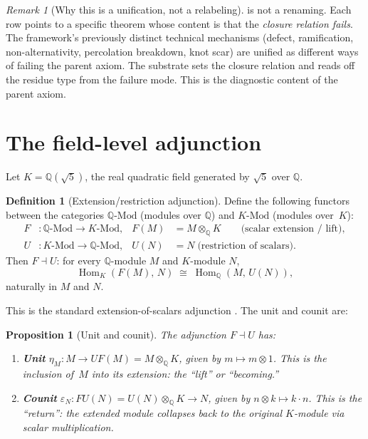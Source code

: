 \documentclass[11pt,a4paper]{article}
\theoremstyle{plain}
\newtheorem{proposition}[theorem]{Proposition}
\theoremstyle{definition}
\newtheorem{definition}[theorem]{Definition}
\theoremstyle{remark}
\newtheorem{remark}[theorem]{Remark}
\numberwithin{equation}{section}
\providecommand{\Q}{\mathbb{Q}}
\DeclareMathOperator{\Hom}{Hom}
\begin{document}
\begin{remark}[Why this is a unification, not a relabeling]
\label{rmk:not-relabeling}
 is not a renaming.  Each row
points to a specific theorem whose content is that the
\emph{closure relation fails}.  The framework's previously
distinct technical mechanisms (defect, ramification,
non-alternativity, percolation breakdown, knot scar) are unified
as different ways of failing the parent axiom.  The substrate
sets the closure relation and reads off the residue type from
the failure mode.  This is the diagnostic content of the parent
axiom.
\end{remark}

\section{The field-level adjunction}
\label{sec:adjunction}

Let $K = \Q(\sqrt{5})$, the real quadratic field generated by
$\sqrt{5}$ over $\Q$.

\begin{definition}[Extension/restriction adjunction]
\label{def:adjunction}
Define the following functors between the categories $\Q\text{-Mod}$
(modules over $\Q$) and $K\text{-Mod}$ (modules over~$K$):
\begin{align}
  F &\colon \Q\text{-Mod} \to K\text{-Mod},
  & F(M) &= M \otimes_{\Q} K
  \qquad\text{(scalar extension / lift)},
  \label{eq:F}\\[4pt]
  U &\colon K\text{-Mod} \to \Q\text{-Mod},
  & U(N) &= N \;\text{(restriction of scalars)}.
  \label{eq:U}
\end{align}
Then $F \dashv U$: for every $\Q$-module $M$ and $K$-module $N$,
\[
  \Hom_K(F(M),\, N) \;\cong\; \Hom_{\Q}(M,\, U(N)),
\]
naturally in $M$ and $N$.
\end{definition}

This is the standard extension-of-scalars adjunction
\cite[Ch.~IV]{maclane-cwm}.  The unit and counit are:

\begin{proposition}[Unit and counit]
\label{prop:unit-counit}
The adjunction $F \dashv U$ has:
\begin{enumerate}[label=(\roman*)]
  \item \textbf{Unit} $\eta_M \colon M \to UF(M) = M \otimes_\Q K$,
    given by $m \mapsto m \otimes 1$.  This is the inclusion of~$M$
    into its extension: the ``lift'' or ``becoming.''
  \item \textbf{Counit} $\varepsilon_N \colon FU(N) = U(N)
    \otimes_\Q K \to N$, given by $n \otimes k \mapsto k \cdot n$.
    This is the ``return'': the extended module collapses back to
    the original $K$-module via scalar multiplication.
\end{enumerate}
\end{proposition}
\end{document}
